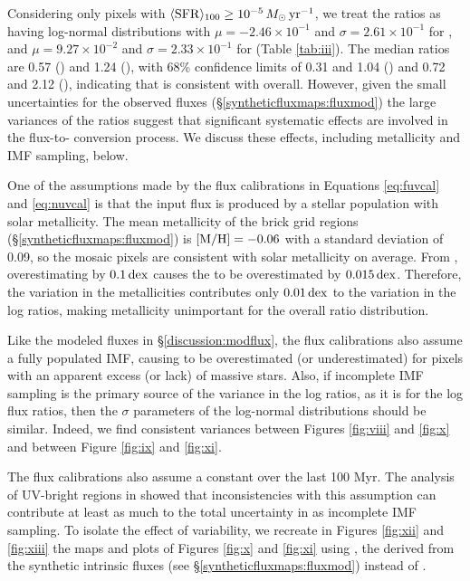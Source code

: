 \documentclass[iop, tighten]{emulateapj}
\begin{document}
Considering only pixels with $\langle\mathrm{SFR}\rangle_{100} \ge 10^{-5}\,M_\odot\,\mathrm{yr}^{-1}$, we treat the
\sfr{} ratios as having log-normal distributions with $\mu = -2.46\times
10^{-1}$ and $\sigma = 2.61\times 10^{-1}$ for \fuv{}, and $\mu = 9.27\times
10^{-2}$ and $\sigma = 2.33\times 10^{-1}$ for \nuv{} (Table \ref{tab:iii}). The
median ratios are 0.57 (\fuv{}) and 1.24 (\nuv{}), with 68\% confidence limits
of 0.31 and 1.04 (\fuv{}) and 0.72 and 2.12 (\nuv{}), indicating that \sfrx{} is
consistent with \sfroneh{} overall. However, given the small uncertainties for
the observed fluxes (\S \ref{syntheticfluxmaps:fluxmod}) the large variances of
the \sfr{} ratios suggest that significant systematic effects are involved in
the flux-to-\sfr{} conversion process. We discuss these effects, including
metallicity and IMF sampling, below.

One of the assumptions made by the flux calibrations in Equations
\ref{eq:fuvcal} and \ref{eq:nuvcal} is that the input flux is produced by a
stellar population with solar metallicity. The mean metallicity of the brick
grid regions (\S \ref{syntheticfluxmaps:fluxmod}) is $\mathrm{[M/H]} = -0.06$ with a
standard deviation of 0.09, so the mosaic pixels are consistent with solar
metallicity on average. From \citet{Simones:2014}, overestimating \met{} by
$0.1\,\mathrm{dex}$ causes the \sfr{} to be overestimated by $0.015\,\mathrm{dex}$. Therefore, the
variation in the metallicities contributes only $0.01\,\mathrm{dex}$ to the variation in
the log \sfr{} ratios, making metallicity unimportant for the overall \sfr{}
ratio distribution.

Like the modeled fluxes in \S \ref{discussion:modflux}, the flux calibrations
also assume a fully populated IMF, causing \sfrx{} to be overestimated (or
underestimated) for pixels with an apparent excess (or lack) of massive stars.
Also, if incomplete IMF sampling is the primary source of the variance in the
log \sfr{} ratios, as it is for the log flux ratios, then the $\sigma$
parameters of the log-normal distributions should be similar. Indeed, we find
consistent variances between Figures \ref{fig:viii} and
\ref{fig:x} and between Figure \ref{fig:ix} and
\ref{fig:xi}.

The flux calibrations also assume a constant \sfh{} over the last 100 Myr. The
analysis of UV-bright regions in \citet{Simones:2014} showed that
inconsistencies with this assumption can contribute at least as much to the
total uncertainty in \sfrfuv{} as incomplete IMF sampling. To isolate the
effect of \sfh{} variability, we recreate in Figures \ref{fig:xii} and
\ref{fig:xiii} the maps and plots of Figures \ref{fig:x} and
\ref{fig:xi} using \sfrxz{}, the  derived from the synthetic
intrinsic fluxes (see \S \ref{syntheticfluxmaps:fluxmod}) instead of \sfrx{}.
\end{document}
